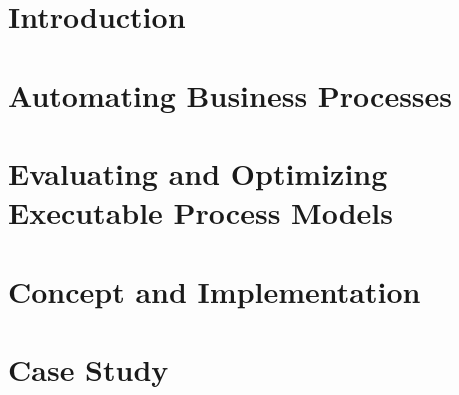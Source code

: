 \documentclass[draft,final]{vutinfth} %
\begin{document}


\frontmatter %



\AddStatementPage







\tableofcontents %

\mainmatter

\chapter{Introduction}


\chapter{Automating Business Processes}


\chapter{Evaluating and Optimizing Executable Process Models}


\chapter{Concept and Implementation}


\chapter{Case Study}

\end{document}
